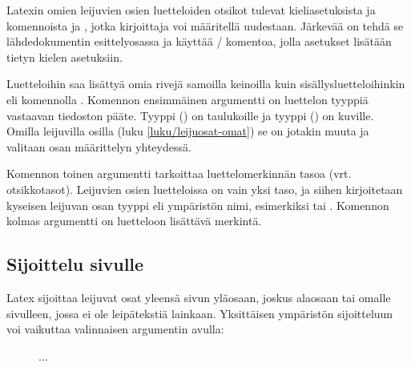Latexin omien leijuvien osien luetteloiden otsikot tulevat
kieliasetuksista ja komennoista  ja
, jotka kirjoittaja voi määritellä uudestaan.
Järkevää on tehdä se lähdedokumentin esittelyosassa ja käyttää
\-/ komentoa, jolla asetukset lisätään tietyn kielen
asetuksiin.

\begin{koodilohkosis}
\addto{\captionsfinnish}{
  \renewcommand{\listtablename}{Omat taulukot}
  \renewcommand{\listfigurename}{Omat kuvat}
}
\end{koodilohkosis}

\noindent
Luetteloihin saa lisättyä omia rivejä samoilla keinoilla kuin
sisällysluetteloihinkin eli komennolla .
Komennon ensimmäinen argumentti on luettelon tyyppiä vastaavan tiedoston
pääte. Tyyppi  () on taulukoille ja
tyyppi  () on kuville. Omilla
leijuvilla osilla (luku \ref{luku/leijuosat-omat}) se on jotakin muuta
ja valitaan osan määrittelyn yhteydessä.

\begin{koodilohkosis}
\end{koodilohkosis}

\noindent
Komennon toinen argumentti tarkoittaa luettelomerkinnän tasoa (vrt.
otsikkotasot). Leijuvien osien luetteloissa on vain yksi taso, ja siihen
kirjoitetaan kyseisen leijuvan osan tyyppi eli ympäristön nimi,
esimerkiksi  tai . Komennon kolmas
argumentti on luetteloon lisättävä merkintä.

\subsection{Sijoittelu sivulle}
\label{luku/leijuosat-sijoittelu}

Latex sijoittaa leijuvat osat yleensä sivun yläosaan, joskus alaosaan
tai omalle sivulleen, jossa ei ole leipätekstiä lainkaan. Yksittäisen
ympäristön sijoitteluun voi vaikuttaa valinnaisen argumentin avulla:

\begin{koodilohkosis}
\begin{figure}[sijainti]
  ...
\end{figure}
\end{koodilohkosis}

